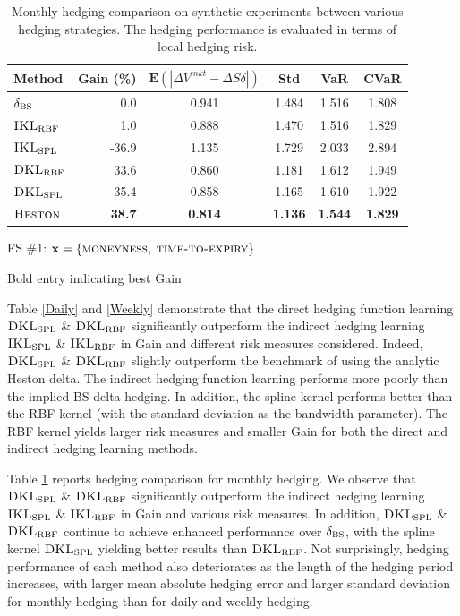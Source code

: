 \documentclass[letterpaper,12pt,titlepage,oneside,final]{book}
\numberwithin{equation}{section}
\theoremstyle{definition}
\newcommand{\vx}{\mathbf{x}}
\newcommand{\E}{\mathbf{E}}
\newcommand{\DS}{\Delta S}
\newcommand{\Heston}{\textsc{Heston}}
\newcommand{\DVmkt}{\Delta V^{mkt}}
\newcommand{\MeanAbs}{\E(|\DVmkt-\DS \delta |)}
\newcommand{\DKLs}{\bf\textsc{DKL}_{\text{SPL}}}
\newcommand{\DKLg}{\bf\textsc{DKL}_{\text{RBF}}}
\newcommand{\IKLs}{\bf\textsc{IKL}_{\text{SPL}}}
\newcommand{\IKLg}{\bf\textsc{IKL}_{\text{RBF}}}
\newcommand{\Del}{\delta_{\textsc{BS}}}
\begin{document}
\begin{table}[htp!]
\begin{center}
\begin{threeparttable}
\begin{tabular}{|l|r c c c c|}
\hline
Method & Gain (\%)& $\MeanAbs$ & Std& VaR & CVaR   \\ \hline
$\Del$ & 0.0 & 0.941 & 1.484 & 1.516 & 1.808 \\
$\IKLg$  & 1.0 & 0.888 & 1.470 & 1.516 & 1.829 \\
$\IKLs$  & -36.9 & 1.135 & 1.729 & 2.033 & 2.894 \\
$\DKLg$  & 33.6 & 0.860 & 1.181 & 1.612 & 1.949 \\
$\DKLs$  & {35.4} & {0.858} & {1.165} & {1.610} & {1.922} \\
$\Heston$ & \textbf{38.7} & \textbf{0.814} & \textbf{1.136} & \textbf{1.544} & \textbf{1.829} \\
\hline
\end{tabular}
\caption{Monthly hedging comparison on synthetic experiments between various hedging strategies. The hedging performance is evaluated in terms of local hedging risk.}
\label{Monthly}
\begin{tablenotes}
    \small
  \item[1] FS \#1: $\vx=\{\textsc{moneyness,~time-to-expiry}\}$
  \item[2] Bold entry indicating best Gain
  \end{tablenotes}
  \end{threeparttable}
  \end{center}
\end{table}


Table \ref{Daily} and \ref{Weekly}  demonstrate that the direct hedging function learning $\DKLs$ \& $\DKLg$  significantly outperform the indirect hedging learning $\IKLs$ \& $\IKLg$ in Gain and different risk measures considered. Indeed, $\DKLs$ \& $\DKLg$ slightly outperform the benchmark of using the analytic Heston delta.
The indirect hedging function learning performs more poorly than the implied BS delta hedging. In addition,  the spline kernel performs better than the RBF kernel (with the standard deviation as the bandwidth parameter). The RBF kernel yields larger risk measures and smaller Gain  for both the direct and indirect hedging learning methods.

Table \ref{Monthly} reports hedging comparison for monthly hedging. We  observe that  $\DKLs$ \& $\DKLg$  significantly outperform the indirect hedging learning $\IKLs$ \& $\IKLg$ in  Gain and various risk measures. In addition, $\DKLs$ \& $\DKLg$ continue to achieve enhanced performance over $\Del$, with the spline kernel $\DKLs$ yielding better results than $\DKLg$.
Not surprisingly, hedging performance of each method also deteriorates as the length of the hedging period increases,  with larger mean absolute hedging error and larger standard deviation for monthly hedging than for daily and weekly hedging.
\end{document}
